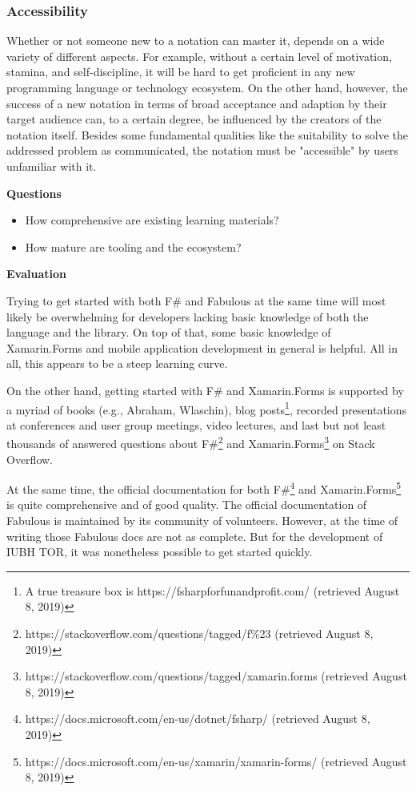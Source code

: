 \subsubsection{Accessibility}

Whether or not someone new to a notation can master it, depends on a wide variety of different aspects. For example, without a certain level of motivation, stamina, and self-discipline, it will be hard to get proficient in any new programming language or technology ecosystem. On the other hand, however, the success of a new notation in terms of broad acceptance and adaption by their target audience can, to a certain degree, be influenced by the creators of the notation itself. Besides some fundamental qualities like the suitability to solve the addressed problem as communicated, the notation must be "accessible" by users unfamiliar with it.

\textbf{Questions}

\begin{itemize}
\item How comprehensive are existing learning materials?
\item How mature are tooling and the ecosystem?
\end{itemize}

\textbf{Evaluation}

Trying to get started with both F\# and Fabulous at the same time will most likely be overwhelming for developers lacking basic knowledge of both the language and the library. On top of that, some basic knowledge of Xamarin.Forms and mobile application development in general is helpful. All in all, this appears to be a steep learning curve.

On the other hand, getting started with F\# and Xamarin.Forms is supported by a myriad of books (e.g., Abraham, Wlaschin), blog posts\footnote{A true treasure box is https://fsharpforfunandprofit.com/ (retrieved August 8, 2019)}, recorded presentations at conferences and user group meetings, video lectures, and last but not least thousands of answered questions about F\#\footnote{https://stackoverflow.com/questions/tagged/f\%23 (retrieved August 8, 2019)} and Xamarin.Forms\footnote{https://stackoverflow.com/questions/tagged/xamarin.forms (retrieved August 8, 2019)} on Stack Overflow.

At the same time, the official documentation for both F\#\footnote{https://docs.microsoft.com/en-us/dotnet/fsharp/ (retrieved August 8, 2019)} and Xamarin.Forms\footnote{https://docs.microsoft.com/en-us/xamarin/xamarin-forms/ (retrieved August 8, 2019)} is quite comprehensive and of good quality. The official documentation of Fabulous is maintained by its community of volunteers. However, at the time of writing those Fabulous docs are not as complete. But for the development of IUBH TOR, it was nonetheless possible to get started quickly. 

